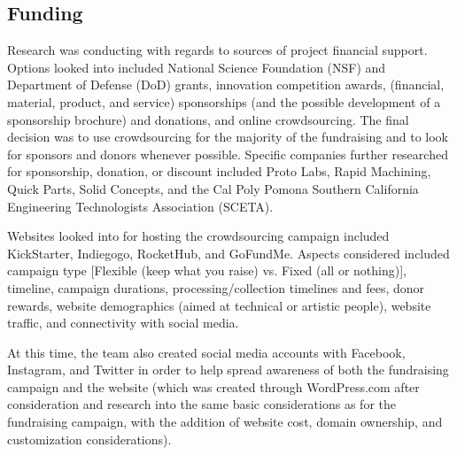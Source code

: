 \documentclass{report}
\begin{document}
\subsection{Funding}
Research was conducting with regards to sources of project financial support.  Options looked into included National Science Foundation (NSF) and Department of Defense (DoD) grants, innovation competition awards, (financial, material, product, and service) sponsorships (and the possible development of a sponsorship brochure) and donations, and online crowdsourcing.  The final decision was to use crowdsourcing for the majority of the fundraising and to look for sponsors and donors whenever possible.  Specific companies further researched for sponsorship, donation, or discount included Proto Labs, Rapid Machining, Quick Parts, Solid Concepts, and the Cal Poly Pomona Southern California Engineering Technologists Association (SCETA).\par
Websites looked into for hosting the crowdsourcing campaign included KickStarter, Indiegogo, RocketHub, and GoFundMe.  Aspects considered included campaign type [Flexible (keep what you raise) vs. Fixed (all or nothing)], timeline, campaign durations, processing/collection timelines and fees, donor rewards, website demographics (aimed at technical or artistic people), website traffic, and connectivity with social media.\par
At this time, the team also created social media accounts with Facebook, Instagram, and Twitter in order to help spread awareness of both the fundraising campaign and the website (which was created through WordPress.com after consideration and research into the same basic considerations as for the fundraising campaign, with the addition of website cost, domain ownership, and customization considerations).
\end{document}
